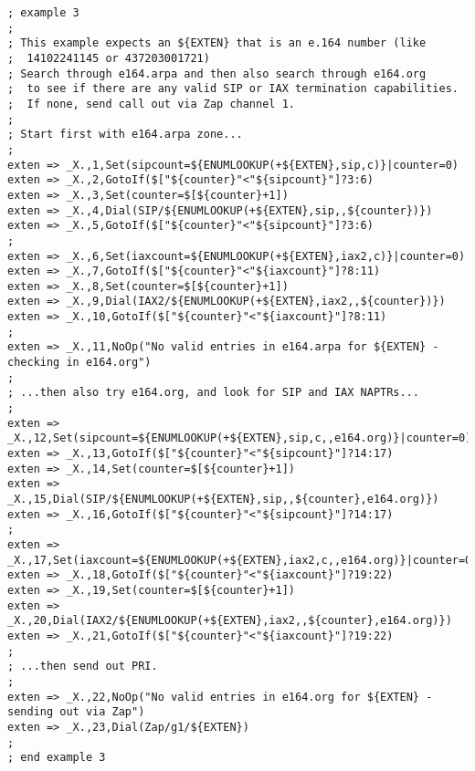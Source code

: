 \begin{astlisting}
\begin{verbatim}
; example 3
;
; This example expects an ${EXTEN} that is an e.164 number (like
;  14102241145 or 437203001721)
; Search through e164.arpa and then also search through e164.org
;  to see if there are any valid SIP or IAX termination capabilities.
;  If none, send call out via Zap channel 1.
;
; Start first with e164.arpa zone...
;
exten => _X.,1,Set(sipcount=${ENUMLOOKUP(+${EXTEN},sip,c)}|counter=0)
exten => _X.,2,GotoIf($["${counter}"<"${sipcount}"]?3:6)
exten => _X.,3,Set(counter=$[${counter}+1])
exten => _X.,4,Dial(SIP/${ENUMLOOKUP(+${EXTEN},sip,,${counter})})
exten => _X.,5,GotoIf($["${counter}"<"${sipcount}"]?3:6)
;
exten => _X.,6,Set(iaxcount=${ENUMLOOKUP(+${EXTEN},iax2,c)}|counter=0)
exten => _X.,7,GotoIf($["${counter}"<"${iaxcount}"]?8:11)
exten => _X.,8,Set(counter=$[${counter}+1])
exten => _X.,9,Dial(IAX2/${ENUMLOOKUP(+${EXTEN},iax2,,${counter})})
exten => _X.,10,GotoIf($["${counter}"<"${iaxcount}"]?8:11)
;
exten => _X.,11,NoOp("No valid entries in e164.arpa for ${EXTEN} - checking in e164.org")
;
; ...then also try e164.org, and look for SIP and IAX NAPTRs...
;
exten => _X.,12,Set(sipcount=${ENUMLOOKUP(+${EXTEN},sip,c,,e164.org)}|counter=0)
exten => _X.,13,GotoIf($["${counter}"<"${sipcount}"]?14:17)
exten => _X.,14,Set(counter=$[${counter}+1])
exten => _X.,15,Dial(SIP/${ENUMLOOKUP(+${EXTEN},sip,,${counter},e164.org)})
exten => _X.,16,GotoIf($["${counter}"<"${sipcount}"]?14:17)
;
exten => _X.,17,Set(iaxcount=${ENUMLOOKUP(+${EXTEN},iax2,c,,e164.org)}|counter=0)
exten => _X.,18,GotoIf($["${counter}"<"${iaxcount}"]?19:22)
exten => _X.,19,Set(counter=$[${counter}+1])
exten => _X.,20,Dial(IAX2/${ENUMLOOKUP(+${EXTEN},iax2,,${counter},e164.org)})
exten => _X.,21,GotoIf($["${counter}"<"${iaxcount}"]?19:22)
;
; ...then send out PRI.
;
exten => _X.,22,NoOp("No valid entries in e164.org for ${EXTEN} - sending out via Zap")
exten => _X.,23,Dial(Zap/g1/${EXTEN})
;
; end example 3

\end{verbatim}
\end{astlisting}
